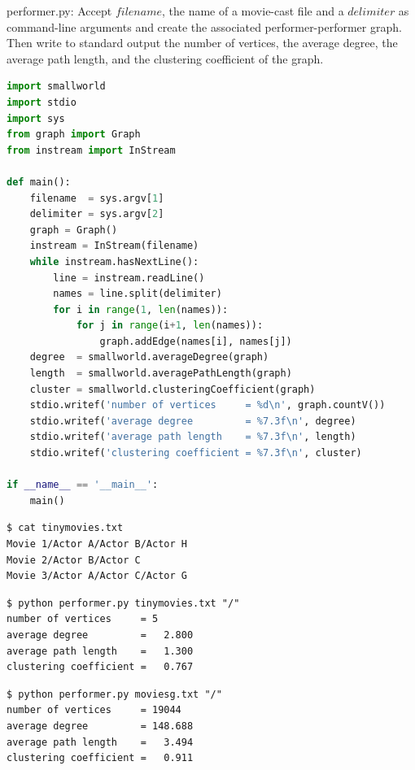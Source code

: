 \documentclass[8pt,a4paper,compress]{beamer}
\begin{document}
\begin{frame}[fragile]
\pause

\begin{framed}
\tiny performer.py: Accept $filename$, the name of a movie-cast file and a $delimiter$ as command-line arguments and create the associated performer-performer graph. Then write to standard output the number of vertices, the average degree, the average path length, and the clustering coefficient of the graph.
\end{framed}

\begin{lstlisting}[language=Python]
import smallworld
import stdio
import sys
from graph import Graph
from instream import InStream

def main():
    filename  = sys.argv[1]
    delimiter = sys.argv[2]
    graph = Graph()
    instream = InStream(filename)
    while instream.hasNextLine():
        line = instream.readLine()
        names = line.split(delimiter)
        for i in range(1, len(names)):
            for j in range(i+1, len(names)):
                graph.addEdge(names[i], names[j])
    degree  = smallworld.averageDegree(graph)
    length  = smallworld.averagePathLength(graph)
    cluster = smallworld.clusteringCoefficient(graph)
    stdio.writef('number of vertices     = %d\n', graph.countV())
    stdio.writef('average degree         = %7.3f\n', degree)
    stdio.writef('average path length    = %7.3f\n', length)
    stdio.writef('clustering coefficient = %7.3f\n', cluster)

if __name__ == '__main__':
    main()
\end{lstlisting}
\end{frame}

\begin{frame}[fragile]
\pause

\begin{lstlisting}[language={}]
$ cat tinymovies.txt
Movie 1/Actor A/Actor B/Actor H
Movie 2/Actor B/Actor C
Movie 3/Actor A/Actor C/Actor G
\end{lstlisting}

\pause

\begin{lstlisting}[language={}]
$ python performer.py tinymovies.txt "/"
number of vertices     = 5
average degree         =   2.800
average path length    =   1.300
clustering coefficient =   0.767
\end{lstlisting}

\pause

\begin{lstlisting}[language={}]
$ python performer.py moviesg.txt "/"
number of vertices     = 19044
average degree         = 148.688
average path length    =   3.494
clustering coefficient =   0.911
\end{lstlisting}
\end{frame}
\end{document}

